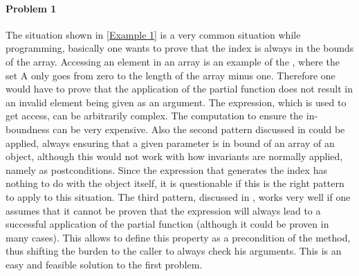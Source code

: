 \paragraph{Problem 1}
The situation shown in \ref{Example 1} is a very common situation while programming, basically one wants to prove that the index is always in the bounds of the array. Accessing an element in an array is an example of the , where the set A only goes from zero to the length of the array minus one. Therefore one would have to prove that the application of the partial function does not result in an invalid element being given as an argument. The expression, which is used to get access, can be arbitrarily complex. The computation to ensure the in-boundness can be very expensive.  \newline
Also the second pattern discussed in  could be applied, always ensuring that a given parameter is in bound of an array of an object, although this would not work with how invariants are normally applied, namely as postconditions. Since the expression that generates the index has nothing to do with the object itself, it is questionable if this is the right pattern to apply to this situation. \newline
The third pattern, discussed in , works very well if one assumes that it cannot be proven that the expression will always lead to a successful application of the partial function (although it could be proven in many cases). This allows to define this property as a precondition of the method, thus shifting the burden to the caller to always check his arguments. This is an easy and feasible solution to the first problem. 

